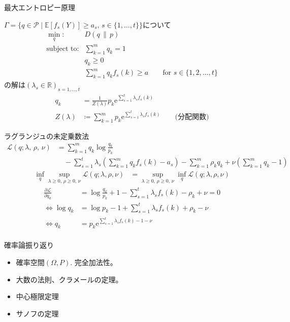 \documentclass[lualatex,handout]{beamer}
\newcommand{\expt}[1]{\mathbb{E}\left[#1\right]}
\newcommand\KL[2]{D\left(#1\,\|\,#2\right)}
\theoremstyle{definition}
\begin{document}
\begin{frame}{最大エントロピー原理}
\begin{theorem}
$\Gamma=\{q\in\mathcal{P}\mid \expt{f_s(Y)}\ge a_s,\, s\in\{1,\dotsc,t\}\}$について
\begin{align*}
\min_{q}\colon& \KL{q}{p}\\
\text{subject to}\colon& \sum_{k=1}^m q_k = 1\\
&q_k\ge 0\\
&\sum_{k=1}^m q_k f_s(k) \ge a\qquad \text{for } s\in\{1,2,\dotsc,t\} 
\end{align*}
の解は$(\lambda_s\in\mathbb{R})_{s=1,\dotsc,t}$
\begin{align*}
q_k &= \frac1{Z(\lambda)} p_k\mathrm{e}^{\sum_{s=1}^t \lambda_s f_s(k)}\\
Z(\lambda) &\coloneq \sum_{k=1}^m p_k\mathrm{e}^{\sum_{s=1}^t \lambda_s f_s(k)} \qquad \text{(分配関数)}
\end{align*}
\end{theorem}
\end{frame}

\begin{frame}{ラグランジュの未定乗数法}
\begin{align*}
\mathcal{L}(q;\lambda,\,\rho,\,\nu) &= \sum_{k=1}^m q_k\log\frac{q_k}{p_k}\\
&\quad - \sum_{s=1}^t \lambda_s \left(\sum_{k=1}^m q_k f_s(k) - a_s\right) - \sum_{k=1}^m \rho_k q_k + \nu \left(\sum_{k=1}^m q_k - 1\right)
\end{align*}
\begin{align*}
\inf_{q}\sup_{\lambda\ge 0,\, \rho\ge0,\, \nu} \mathcal{L}(q;\lambda,\rho,\nu) &= 
\sup_{\lambda\ge 0,\, \rho\ge0,\, \nu}\inf_{q} \mathcal{L}(q;\lambda,\rho,\nu)
\end{align*}
\begin{align*}
\frac{\partial \mathcal{L}}{\partial q_k} &= \log\frac{q_k}{p_k} + 1 - \sum_{s=1}^t \lambda_s f_s(k) - \rho_k + \nu = 0\\
\iff \log q_k &= \log p_k - 1 + \sum_{s=1}^t \lambda_s f_s(k) + \rho_k - \nu\\
\iff q_k &= p_k \mathrm{e}^{\sum_{s=1}^t \lambda_s f_s(k) - 1 - \nu}\\
\end{align*}
\end{frame}

\begin{frame}{確率論振り返り}
\begin{itemize}
\setlength{\itemsep}{2em}
\item 確率空間$(\Omega, P)$. 完全加法性。
\item 大数の法則、クラメールの定理。
\item 中心極限定理
\item サノフの定理
\end{itemize}
\end{frame}
\end{document}
